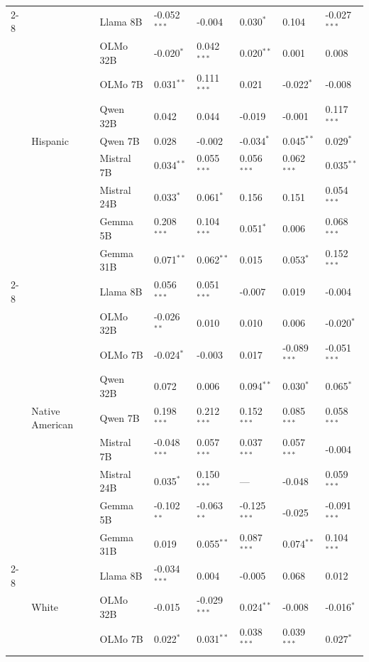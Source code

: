 \begin{longtable}[t]{llllllll}
\cline{2-8}
 & \multirow[t]{9}{*}{Hispanic} & Llama 8B & -0.052$^{***}$ & -0.004 & 0.030$^{*}$ & 0.104 & -0.027$^{***}$ \\
 &  & OLMo 32B & -0.020$^{*}$ & 0.042$^{***}$ & 0.020$^{**}$ & 0.001 & 0.008 \\
 &  & OLMo 7B & 0.031$^{**}$ & 0.111$^{***}$ & 0.021 & -0.022$^{*}$ & -0.008 \\
 &  & Qwen 32B & 0.042 & 0.044 & -0.019 & -0.001 & 0.117$^{***}$ \\
 &  & Qwen 7B & 0.028 & -0.002 & -0.034$^{*}$ & 0.045$^{**}$ & 0.029$^{*}$ \\
 &  & Mistral 7B & 0.034$^{**}$ & 0.055$^{***}$ & 0.056$^{***}$ & 0.062$^{***}$ & 0.035$^{**}$ \\
 &  & Mistral 24B & 0.033$^{*}$ & 0.061$^{*}$ & 0.156 & 0.151 & 0.054$^{***}$ \\
 &  & Gemma 5B & 0.208$^{***}$ & 0.104$^{***}$ & 0.051$^{*}$ & 0.006 & 0.068$^{***}$ \\
 &  & Gemma 31B & 0.071$^{**}$ & 0.062$^{**}$ & 0.015 & 0.053$^{*}$ & 0.152$^{***}$ \\
\cline{2-8}
 & \multirow[t]{9}{*}{Native American} & Llama 8B & 0.056$^{***}$ & 0.051$^{***}$ & -0.007 & 0.019 & -0.004 \\
 &  & OLMo 32B & -0.026$^{**}$ & 0.010 & 0.010 & 0.006 & -0.020$^{*}$ \\
 &  & OLMo 7B & -0.024$^{*}$ & -0.003 & 0.017 & -0.089$^{***}$ & -0.051$^{***}$ \\
 &  & Qwen 32B & 0.072 & 0.006 & 0.094$^{**}$ & 0.030$^{*}$ & 0.065$^{*}$ \\
 &  & Qwen 7B & 0.198$^{***}$ & 0.212$^{***}$ & 0.152$^{***}$ & 0.085$^{***}$ & 0.058$^{***}$ \\
 &  & Mistral 7B & -0.048$^{***}$ & 0.057$^{***}$ & 0.037$^{***}$ & 0.057$^{***}$ & -0.004 \\
 &  & Mistral 24B & 0.035$^{*}$ & 0.150$^{***}$ & --- & -0.048 & 0.059$^{***}$ \\
 &  & Gemma 5B & -0.102$^{**}$ & -0.063$^{**}$ & -0.125$^{***}$ & -0.025 & -0.091$^{***}$ \\
 &  & Gemma 31B & 0.019 & 0.055$^{**}$ & 0.087$^{***}$ & 0.074$^{**}$ & 0.104$^{***}$ \\
\cline{2-8}
 & \multirow[t]{9}{*}{White} & Llama 8B & -0.034$^{***}$ & 0.004 & -0.005 & 0.068 & 0.012 \\
 &  & OLMo 32B & -0.015 & -0.029$^{***}$ & 0.024$^{**}$ & -0.008 & -0.016$^{*}$ \\
 &  & OLMo 7B & 0.022$^{*}$ & 0.031$^{**}$ & 0.038$^{***}$ & 0.039$^{***}$ & 0.027$^{*}$ \\

\end{longtable}
